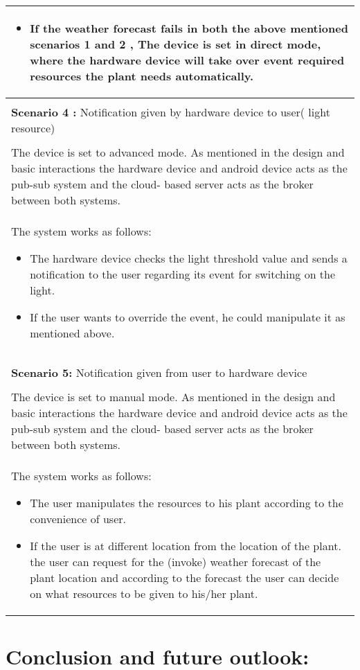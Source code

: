 \documentclass[10pt]{article}
\begin{document}
\begin{longtable}{p{}}
\begin{itemize}
\item If the weather forecast fails in both the above mentioned scenarios 1 and 2 , The device is set in direct mode, where the hardware device will take over event required resources the plant needs automatically.
\end{itemize}
\\
\hline
\\
\textbf{Scenario 4 :} Notification given by hardware device to user( light resource)\\
\hline 
\\
The device is set to advanced mode.
As mentioned in the design and basic interactions the hardware device and android device acts as the pub-sub system and the cloud- based server acts as the broker between both systems. \\The system works as follows:
\begin{itemize}
\item The hardware device checks the light threshold value and sends a notification to the user regarding its event for switching on the light.
\item If the user wants to override the event, he could manipulate it as mentioned above.
\end{itemize}\\ 
\hline \\
\pagebreak
\hline \\
\textbf{Scenario 5:} Notification given from user to hardware device\\
\hline\\
The device is set to manual mode.
As mentioned in the design and basic interactions the hardware device and android device acts as the pub-sub system and the cloud- based server acts as the broker between both systems.\\
 The system works as follows:
\begin{itemize}
\item The user manipulates the resources to his plant according to the convenience of user.
\item If the user is at different location from the location of the plant. the user can request for the (invoke) weather forecast of the plant location and according to the forecast the user can decide on what resources to be given to his/her plant.
\end{itemize}
\\
\hline
\end{longtable}


\section*{Conclusion and future outlook:}
\end{document}
